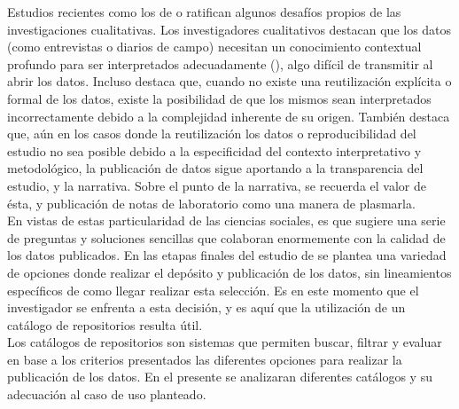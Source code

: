 \documentclass{article}
\begin{document}
Estudios recientes como los de \cite{lamb2024} o \cite{gray2023} ratifican algunos desafíos propios de las investigaciones cualitativas. Los investigadores cualitativos destacan que los datos (como entrevistas o diarios de campo) necesitan un conocimiento contextual profundo para ser interpretados adecuadamente (\cite{gray2023}), algo difícil de transmitir al abrir los datos. Incluso destaca que, cuando no existe una reutilización explícita o formal de los datos, existe la posibilidad de que los mismos sean interpretados incorrectamente debido a la complejidad inherente de su origen. También destaca que, aún en los casos donde la reutilización los datos o reproducibilidad del estudio no sea posible debido a la especificidad del contexto interpretativo y metodológico, la publicación de datos sigue aportando a la transparencia del estudio, y la narrativa. Sobre el punto de la narrativa, se recuerda el valor de ésta, y publicación de notas de laboratorio como una manera de plasmarla.\\



En vistas de estas particularidad de las ciencias sociales, es que \cite{logan2021} sugiere una serie de preguntas y soluciones sencillas que colaboran enormemente con la calidad de los datos publicados. En las etapas finales del estudio de \cite{logan2021} se plantea una variedad de opciones donde realizar el depósito y publicación de los datos, sin lineamientos específicos de como llegar realizar esta selección. Es en este momento que el investigador se enfrenta a esta decisión, y es aquí que la utilización de un catálogo de repositorios resulta útil.\\

Los catálogos de repositorios son sistemas que permiten buscar, filtrar y evaluar en base a los criterios presentados las diferentes opciones para realizar la publicación de los datos. En el presente se analizaran diferentes catálogos y su adecuación al caso de uso planteado.\\
\end{document}
